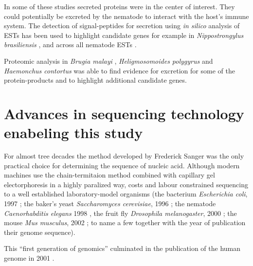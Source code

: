 In some of these studies secreted proteins were in the center of
interest. They could potentially be excreted by the nematode to
interact with the host's immune system. The detection of
signal-peptides for secretion using \textit{in silico} analysis of
ESTs has been used to highlight candidate genes for example in
\textit{Nippostrongylus brasiliensis} \cite{harcus_signal_2004}, and
across all nematode ESTs \cite{nagaraj_needles_2008}.

Proteomic analysis in \textit{Brugia malayi}
\cite{pmid19352421,pmid18958170}, \textit{Heligmosomoides polygyrus}
\cite{pmid21722761} and \textit{Haemonchus contortus}
\cite{pmid12576473} was able to find evidence for excretion for some
of the protein-products and to highlight additional candidate genes.



\section{Advances in sequencing technology enabeling this study}
\label{ad-seq}

For almost tree decades the method developed by Frederick Sanger
\cite{pmid271968} was the only practical choice for determining the
sequence of nucleic acid. Although modern machines use the
chain-termitaion method combined with capillary gel electorphoresis
\cite{pmid2326186} in a highly paralized way, costs and labour
constrained sequencing to a well established laboratory-model
organisms (the bacterium \textit{Escherichia coli}, 1997
\cite{pmid9278503}; the baker's yeast \textit{Saccharomyces
  cerevisiae}, 1996 \cite{pmid8849441}; the nematode
\textit{Caenorhabditis elegans} 1998 \cite{pmid9851916}, the fruit fly
\textit{Drosophila melanogaster}, 2000 \cite{adams2000genome}; the
mouse \textit{Mus musculus}, 2002 \cite{pmid12466850}; to name a few
together with the year of publication their genome sequence).

This ``first generation of genomics'' culminated in the publication of
the human genome in 2001 \cite{pmid11181995}.


